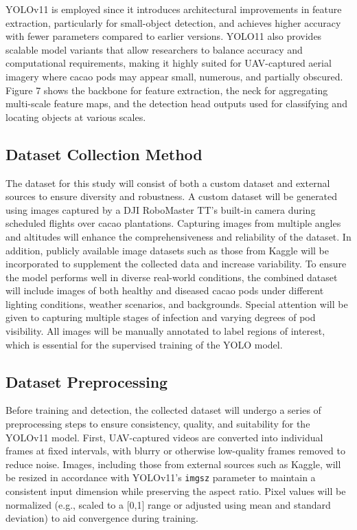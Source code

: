 YOLOv11 is employed since it introduces architectural improvements in feature extraction, particularly for small-object detection, and achieves higher accuracy with fewer parameters compared to earlier versions. YOLO11 also provides scalable model variants that allow researchers to balance accuracy and computational requirements, making it highly suited for UAV-captured aerial imagery where cacao pods may appear small, numerous, and partially obscured. Figure 7 shows the  backbone for feature extraction, the neck for aggregating multi-scale feature maps, and the detection head outputs used for classifying and locating objects at various scales.

\subsection{Dataset Collection Method}
The dataset for this study will consist of both a custom dataset and external sources to ensure diversity and robustness. A custom dataset will be generated using images captured by a DJI RoboMaster TT’s built-in camera during scheduled flights over cacao plantations. Capturing images from multiple angles and altitudes will enhance the comprehensiveness and reliability of the dataset. In addition, publicly available image datasets such as those from Kaggle will be incorporated to supplement the collected data and increase variability. To ensure the model performs well in diverse real-world conditions, the combined dataset will include images of both healthy and diseased cacao pods under different lighting conditions, weather scenarios, and backgrounds. Special attention will be given to capturing multiple stages of infection and varying degrees of pod visibility. All images will be manually annotated to label regions of interest, which is essential for the supervised training of the YOLO model.

\subsection{Dataset Preprocessing}

Before training and detection, the collected dataset will undergo a series of preprocessing steps to ensure consistency, quality, and suitability for the YOLOv11 model. First, UAV-captured videos are converted into individual frames at fixed intervals, with blurry or otherwise low-quality frames removed to reduce noise. Images, including those from external sources such as Kaggle, will be resized in accordance with YOLOv11's \texttt{imgsz} parameter to maintain a consistent input dimension while preserving the aspect ratio. Pixel values will be normalized (e.g., scaled to a [0,1] range or adjusted using mean and standard deviation) to aid convergence during training. 

